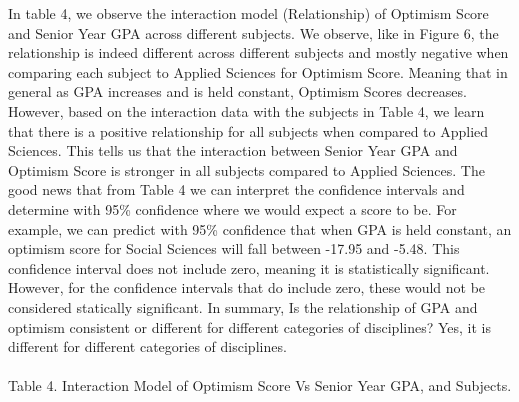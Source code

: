 \documentclass[
  letterpaper,
  DIV=11,
  numbers=noendperiod]{scrartcl}
\makeatletter
\let\oldparagraph\paragraph
\renewcommand{\paragraph}{
    \@ifstar
      \xxxParagraphStar
      \xxxParagraphNoStar
  }
\newcommand{\xxxParagraphStar}[1]{\oldparagraph*{#1}\mbox{}}
\newcommand{\xxxParagraphNoStar}[1]{\oldparagraph{#1}\mbox{}}
\makeatother
\begin{document}
In table 4, we observe the interaction model (Relationship) of Optimism
Score and Senior Year GPA across different subjects. We observe, like in
Figure 6, the relationship is indeed different across different subjects
and mostly negative when comparing each subject to Applied Sciences for
Optimism Score. Meaning that in general as GPA increases and is held
constant, Optimism Scores decreases. However, based on the interaction
data with the subjects in Table 4, we learn that there is a positive
relationship for all subjects when compared to Applied Sciences. This
tells us that the interaction between Senior Year GPA and Optimism Score
is stronger in all subjects compared to Applied Sciences. The good news
that from Table 4 we can interpret the confidence intervals and
determine with 95\% confidence where we would expect a score to be. For
example, we can predict with 95\% confidence that when GPA is held
constant, an optimism score for Social Sciences will fall between -17.95
and -5.48. This confidence interval does not include zero, meaning it is
statistically significant. However, for the confidence intervals that do
include zero, these would not be considered statically significant. In
summary, Is the relationship of GPA and optimism consistent or different
for different categories of disciplines? Yes, it is different for
different categories of disciplines.

\paragraph{Table 4. Interaction Model of Optimism Score Vs Senior Year
GPA, and
Subjects.}\label{table-4.-interaction-model-of-optimism-score-vs-senior-year-gpa-and-subjects.}
\end{document}
